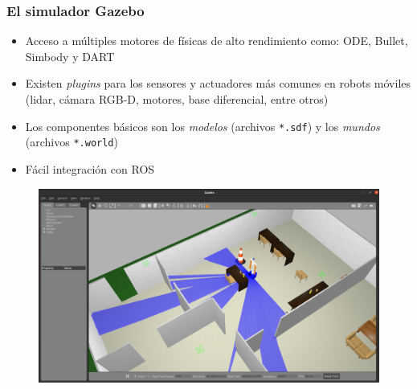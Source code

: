 \begin{frame}\frametitle{El simulador Gazebo}
  \begin{itemize}
  \item Acceso a múltiples motores de físicas de alto rendimiento como: ODE, Bullet, Simbody y DART
  \item Existen \textit{plugins} para los sensores y actuadores más comunes en robots móviles (lidar, cámara RGB-D, motores, base diferencial, entre otros)
  \item Los componentes básicos son los \textit{modelos} (archivos \texttt{*.sdf}) y los \textit{mundos} (archivos \texttt{*.world})
  \item Fácil integración con ROS 
  \end{itemize}
  \begin{figure}
    \centering
    \includegraphics[height=0.6\textheight]{Figures/gazebo.png}
  \end{figure}
\end{frame}

